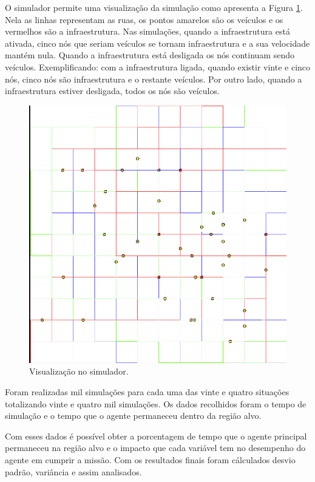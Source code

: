O simulador permite uma visualização da simulação como apresenta a Figura \ref{fig:visulizacaoSimulador}. Nela as linhas representam as ruas, os pontos amarelos são os veículos e os vermelhos são a infraestrutura. Nas simulações, quando a infraestrutura está ativada, cinco nós que seriam veículos se tornam infraestrutura e a sua velocidade mantém nula. Quando a infraestrutura está desligada os nós continuam sendo veículos. Exemplificando: com a infraestrutura ligada, quando existir vinte e cinco nós, cinco nós são infraestrutura e o restante veículos. Por outro lado, quando a infraestrutura estiver desligada, todos os nós são veículos.

\begin{figure}[htbp]
	\centering
	\includegraphics[scale=0.4]{metodologia/figuras/simulacaoGrubix.png}
	\caption{Visualização no simulador.}
	\label{fig:visulizacaoSimulador}
\end{figure}

Foram realizadas mil simulações para cada uma das vinte e quatro situações totalizando vinte e quatro mil simulações. Os dados recolhidos foram o tempo de simulação e o tempo que o agente permaneceu dentro da região alvo.  

Com esses dados é possível obter a porcentagem de tempo que o agente principal permaneceu na região alvo e o impacto que cada variável tem no desempenho do agente em cumprir a missão. Com os resultados finais foram cálculados desvio padrão, variância e assim analisados.
